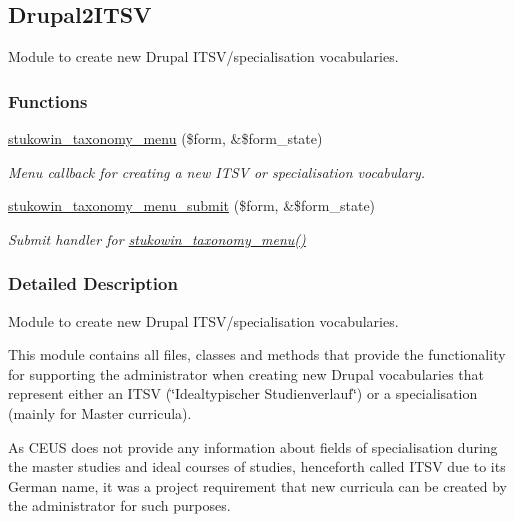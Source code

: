 \hypertarget{group___drupal2_i_t_s_v}{\subsection{Drupal2\+I\+T\+S\+V}
\label{group___drupal2_i_t_s_v}
}


Module to create new Drupal I\+T\+S\+V/specialisation vocabularies.  


\subsubsection*{Functions}
\begin{DoxyCompactItemize}
\item 
\hyperlink{group___drupal2_i_t_s_v_gab706d935ca9d9998c5e25a9ad6486d6a}{stukowin\+\_\+taxonomy\+\_\+menu} (\$form, \&\$form\+\_\+state)
\begin{DoxyCompactList}\small\item\em Menu callback for creating a new I\+T\+S\+V or specialisation vocabulary. \end{DoxyCompactList}\item 
\hyperlink{group___drupal2_i_t_s_v_ga5fb85a53362f6fef40035a6c350c11ea}{stukowin\+\_\+taxonomy\+\_\+menu\+\_\+submit} (\$form, \&\$form\+\_\+state)
\begin{DoxyCompactList}\small\item\em Submit handler for \hyperlink{group___drupal2_i_t_s_v_gab706d935ca9d9998c5e25a9ad6486d6a}{stukowin\+\_\+taxonomy\+\_\+menu()} \end{DoxyCompactList}\end{DoxyCompactItemize}


\subsubsection{Detailed Description}
Module to create new Drupal I\+T\+S\+V/specialisation vocabularies. 

This module contains all files, classes and methods that provide the functionality for supporting the administrator when creating new Drupal vocabularies that represent either an I\+T\+S\+V (\char`\"{}\+Idealtypischer Studienverlauf\char`\"{}) or a specialisation (mainly for Master curricula). 



As C\+E\+U\+S does not provide any information about fields of specialisation during the master studies and ideal courses of studies, henceforth called I\+T\+S\+V due to its German name, it was a project requirement that new curricula can be created by the administrator for such purposes.

